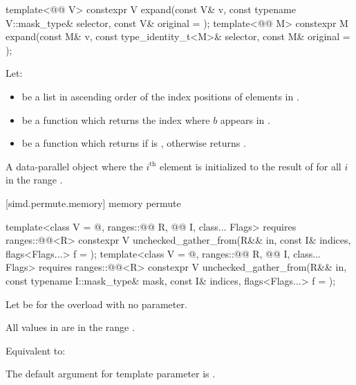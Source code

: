 \begin{itemdecl}
template<@@ V>
  constexpr V expand(const V& v, const typename V::mask_type& selector, const V& original = {});
template<@@ M>
  constexpr M expand(const M& v, const type_identity_t<M>& selector, const M& original = {});
\end{itemdecl}

\begin{itemdescr}
\pnum
Let:
\begin{itemize}
\item
{} be a list in ascending order of the index positions of 
elements in .
\item
{} be a function which returns the index
where $b$ appears in .
\item
{} be a function which returns
 if  is
, otherwise returns .
\end{itemize}

\pnum
\returns
A data-parallel object where the $i^\text{th}$
element is initialized to the result of 
for all $i$ in the range .
\end{itemdescr}

[simd.permute.memory]{ memory permute}

\begin{itemdecl}
template<class V = @\seebelow@, ranges::@@ R, @@ I, class... Flags>
  requires ranges::@@<R>
  constexpr V unchecked_gather_from(R&& in, const I& indices, flags<Flags...> f = {});
template<class V = @\seebelow@, ranges::@@ R, @@ I, class... Flags>
  requires ranges::@@<R>
  constexpr V unchecked_gather_from(R&& in, const typename I::mask_type& mask,
                                    const I& indices, flags<Flags...> f = {});
\end{itemdecl}

\begin{itemdescr}
\pnum
Let  be  for the overload with
no  parameter.

\pnum
\expects
All values in  are in
the range .

\pnum
\effects
Equivalent to: 

\pnum
\remarks
The default argument for template parameter  is
.
\end{itemdescr}

